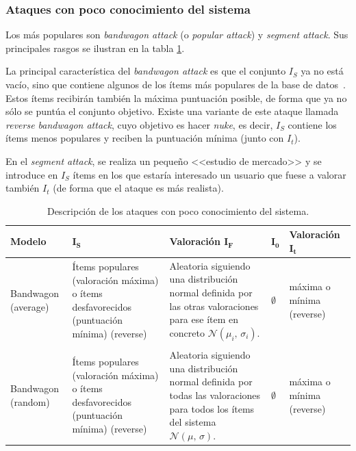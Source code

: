 \subsubsection{Ataques con poco conocimiento del sistema}

Los más populares son \textit{bandwagon attack} (o \textit{popular attack}) y \textit{segment attack}. Sus principales rasgos se ilustran en la tabla \ref{tabla_descripcion_ataques_poco_con}.

La principal característica del \textit{bandwagon attack} es que el conjunto $I_S$ ya no está vacío, sino que contiene algunos de los ítems más populares de la base de datos~\cite{zhou2021SemisupervisedRecommendationAttack}. Estos ítems recibirán también la máxima puntuación posible, de forma que ya no sólo se puntúa el conjunto objetivo. Existe una variante de este ataque llamada \textit{reverse bandwagon attack}, cuyo objetivo es hacer \textit{nuke}, es decir, $I_S$ contiene los ítems menos populares y reciben la puntuación mínima (junto con $I_t$).

En el \textit{segment attack}, se realiza un pequeño <<estudio de mercado>> y se introduce en $I_S$ ítems en los que estaría interesado un usuario que fuese a valorar también $I_t$ (de forma que el ataque es más realista).

\begin{table}
\small
\begin{centering}
	
		\begin{tabular}{@{}p{5em} p{8em} p{8em} p{2em} p{7em}@{}}
			\toprule
			\textbf{Modelo} & $\mathbf{I_S}$ & \textbf{Valoración} $\mathbf{I_F}$ & \hfil $\mathbf{I_0}$ & \textbf{Valoración} $\mathbf{I_t}$\\ 
			\midrule
			
			Bandwagon (average) & Ítems populares (valoración máxima) o ítems desfavorecidos (puntuación mínima) (reverse) & Aleatoria siguiendo una distribución normal definida por las otras valoraciones para ese ítem en concreto $\mathcal{N}(\mu_i,\,\sigma_i)$. & \hfil $\emptyset$ & máxima o mínima (reverse) \\\\
			
			Bandwagon (random) & Ítems populares (valoración máxima) o ítems desfavorecidos (puntuación mínima) (reverse) & Aleatoria siguiendo una distribución normal definida por todas las valoraciones para todos los ítems del sistema $\mathcal{N}(\mu,\,\sigma)$. & \hfil $\emptyset$ & máxima o mínima (reverse) \\
			\bottomrule
		\end{tabular}

\end{centering}
\caption{Descripción de los ataques con poco conocimiento del sistema.}
\label{tabla_descripcion_ataques_poco_con}
\end{table}


